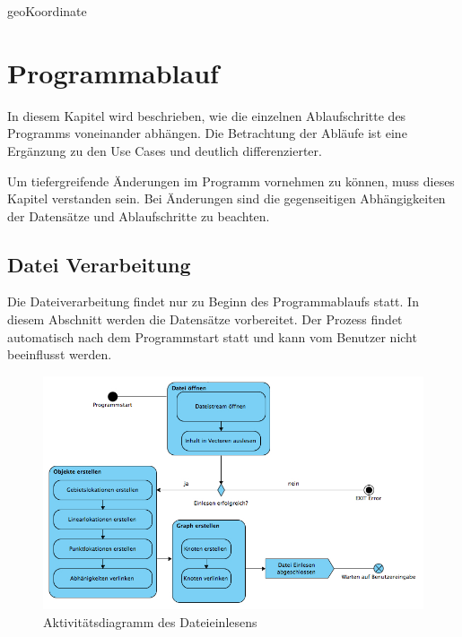 \documentclass[12pt, a4paper, ngerman]{article}
\begin{document}
\begin{attribut}{geoKoordinate}
\end{attribut}	


\section{Programmablauf}
In diesem Kapitel wird beschrieben, wie die einzelnen Ablaufschritte des Programms voneinander abhängen. Die Betrachtung der Abläufe ist eine Ergänzung zu den Use Cases und deutlich differenzierter.

Um tiefergreifende Änderungen im Programm vornehmen zu können, muss dieses Kapitel verstanden sein. Bei Änderungen sind die gegenseitigen Abhängigkeiten der Datensätze und Ablaufschritte zu beachten. 

\subsection{Datei Verarbeitung\label{dateiVerarbeitung}}
Die Dateiverarbeitung findet nur zu Beginn des Programmablaufs statt. In diesem Abschnitt werden die Datensätze vorbereitet. Der Prozess findet automatisch nach dem Programmstart statt und kann vom Benutzer nicht beeinflusst werden.

\begin{figure}[H] 
  \centering
     \includegraphics[width=1.0\textwidth]{Grafiken/aktivitaetsDiagrammDateiEinlesen.jpg}
  \caption{Aktivitätsdiagramm des Dateieinlesens}
  \label{fig:uebersichtDateiEinlesen}
\end{figure}
\end{document}
